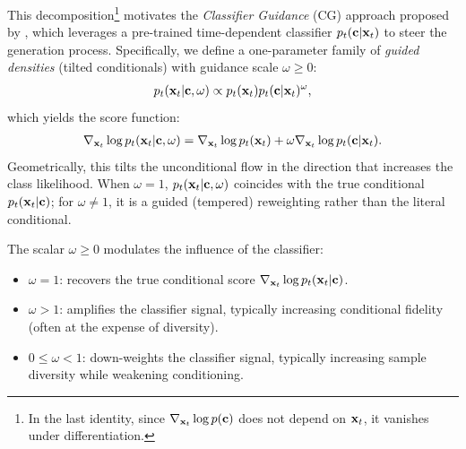 This decomposition\footnote{In the last identity, since $\nabla_{{\mathbf{x}}_t} \log p({\mathbf{c}})$ does not depend on ${\mathbf{x}}_t$, it vanishes under differentiation.} motivates the \emph{Classifier Guidance} (CG) approach proposed by \citet{dhariwal2021diffusion}, which leverages a pre-trained time-dependent classifier $p_t({\mathbf{c}} |{\mathbf{x}}_t)$ to steer the generation process. Specifically, we define a one-parameter family of \emph{guided densities} (tilted conditionals) with guidance scale $\omega \ge 0$:
\begin{align} \label{eq:cg-density-omega}
p_t({\mathbf{x}}_t |{\mathbf{c}}, \omega) \propto p_t({\mathbf{x}}_t)  p_t({\mathbf{c}} |{\mathbf{x}}_t)^{\omega},
\end{align}
which yields the score function:
\begin{align} \label{eq:cg_omega}
\nabla_{{\mathbf{x}}_t} \log p_t({\mathbf{x}}_t |{\mathbf{c}}, \omega)
= \nabla_{{\mathbf{x}}_t} \log p_t({\mathbf{x}}_t) + \omega  \nabla_{{\mathbf{x}}_t} \log p_t({\mathbf{c}} |{\mathbf{x}}_t).
\end{align}
Geometrically, this tilts the unconditional flow in the direction that increases the class likelihood.
When $\omega=1$, $p_t({\mathbf{x}}_t |{\mathbf{c}}, \omega)$ coincides with the true conditional $p_t({\mathbf{x}}_t |{\mathbf{c}})$; for $\omega\neq 1$, it is a guided (tempered) reweighting rather than the literal conditional.

The scalar $\omega \ge 0$ modulates the influence of the classifier:
\begin{itemize}
    \item $\omega = 1$: recovers the true conditional score $\nabla_{{\mathbf{x}}_t} \log p_t({\mathbf{x}}_t |{\mathbf{c}})$.
    \item $\omega > 1$: amplifies the classifier signal, typically increasing conditional fidelity (often at the expense of diversity).
    \item $0 \le \omega < 1$: down-weights the classifier signal, typically increasing sample diversity while weakening conditioning.
\end{itemize}

